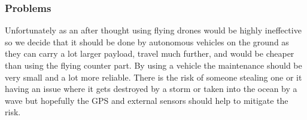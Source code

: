 \documentclass[12pt]{article}
\begin{document}
\subsubsection{Problems}
Unfortunately as an after thought using flying drones would be highly ineffective so we decide that it should be done by autonomous vehicles on the ground as they can carry a lot larger payload, travel much further, and would be cheaper than using the flying counter part. By using a vehicle the maintenance should be very small and a lot more reliable. There is the risk of someone stealing one or it having an issue where it gets destroyed by a storm or taken into the ocean by a wave but hopefully the GPS and external sensors should help to mitigate the risk.





\end{document}
